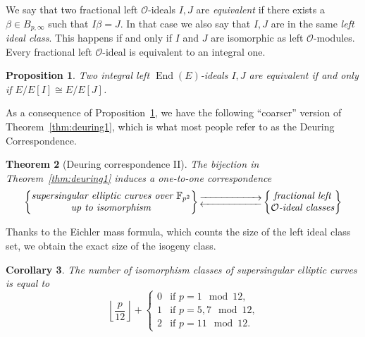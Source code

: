 \documentclass[10pt]{article}
\theoremstyle{plain}
\newtheorem{theorem}{Theorem}
\newtheorem{corollary}[theorem]{Corollary}
\newtheorem{proposition}[theorem]{Proposition}
\theoremstyle{definition}
\DeclareMathOperator{\End}{End} %
\def\F{\ensuremath{\mathbb{F}}}
\def\O{\ensuremath{\mathcal{O}}}
\begin{document}
We say that two fractional left $\O$-ideals $I,J$ are \emph{equivalent}
if there exists a $\beta\in B_{p,\infty}$ such that $I\beta = J$.
In that case we also say that $I,J$ are in the same \emph{left ideal class}.
This happens if and only if $I$ and $J$ are isomorphic as left $\O$-modules.
Every fractional left $\O$-ideal is equivalent to an integral one.

\begin{proposition}\label{prop:idealclasscurve}
    Two integral left $\End(E)$-ideals $I,J$ are equivalent if and only if
    $E/E[I]\cong E/E[J]$.
\end{proposition}


As a consequence of Proposition~\ref{prop:idealclasscurve},
we have the following ``coarser'' version of Theorem~\ref{thm:deuring1},
which is what most people refer to as the Deuring Correspondence.

\begin{theorem}[Deuring correspondence II]
The bijection in Theorem~\ref{thm:deuring1} induces a one-to-one
correspondence
    \begin{equation*}
        \left\{
            \begin{tabular}{@{} c @{}}
                \emph{supersingular elliptic curves over $\F_{p^2}$}\\
                \emph{up to isomorphism}
            \end{tabular}
        \right\}
        \begin{gathered}
            \overset{}{\xrightarrow{\hspace*{2cm}}} \\[-2ex]
            \underset{}{\xleftarrow{\hspace*{2cm}}}
        \end{gathered}
        \left\{
            \begin{tabular}{@{} c @{}}
                \emph{fractional left} \\
                $\O$\emph{-ideal classes}
            \end{tabular}
        \right\}
    \end{equation*}
\end{theorem}


Thanks to the Eichler mass formula, which counts the size of the
left ideal class set, we obtain the exact size of the
isogeny class. %

\begin{corollary}\label{cor:eichlermass}
  The number of isomorphism classes of supersingular elliptic curves
  is equal to
  \begin{equation*}
    \left\lfloor\frac{p}{12}\right\rfloor +
    \begin{cases}
      0 &\text{if $p=1\mod 12$,}\\
      1 &\text{if $p=5,7\mod 12$,}\\
      2 &\text{if $p=11\mod 12$.}
    \end{cases}
  \end{equation*}
\end{corollary}
\end{document}
